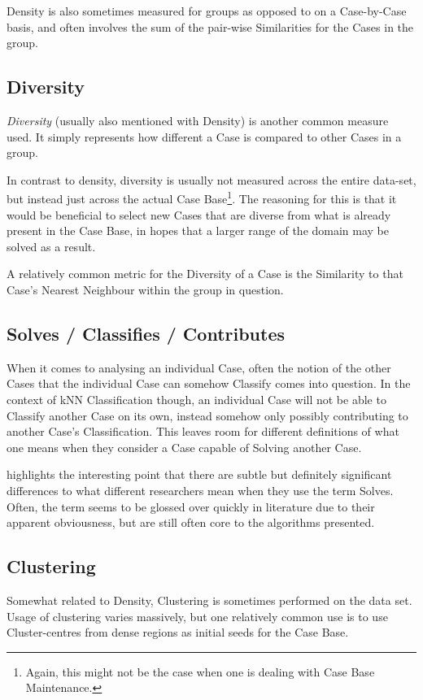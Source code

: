 \documentclass[a4paper,11pt]{report}
\begin{document}
Density is also sometimes measured for groups as opposed to on a Case-by-Case basis\cite{Smyth1998}, and often involves the sum of the pair-wise Similarities for the Cases in the group.

\subsection{Diversity}

\emph{Diversity} (usually also mentioned with Density) is another common measure used. It simply represents how different a Case is compared to other Cases in a group.

In contrast to density, diversity is usually not measured across the entire data-set, but instead just across the actual Case Base\footnote{Again, this might not be the case when one is dealing with Case Base Maintenance.}. The reasoning for this is that it would be beneficial to select new Cases that are diverse from what is already present in the Case Base, in hopes that a larger range of the domain may be solved as a result. 

A relatively common metric for the Diversity of a Case is the Similarity to that Case's Nearest Neighbour within the group in question.

\subsection{Solves / Classifies / Contributes}
When it comes to analysing an individual Case, often the notion of the other Cases that the individual Case can somehow Classify comes into question. In the context of kNN Classification though, an individual Case will not be able to Classify another Case on its own, instead somehow only possibly contributing to another Case's Classification. This leaves room for different definitions of what one means when they consider a Case capable of Solving another Case. 

\citep{BridgeUpcoming} highlights the interesting point that there are subtle but definitely significant differences to what different researchers mean when they use the term Solves. Often, the term seems to be glossed over quickly in literature due to their apparent obviousness, but are still often core to the algorithms presented.

\subsection{Clustering}
Somewhat related to Density, Clustering is sometimes performed on the data set. Usage of clustering varies massively, but one relatively common use is to use Cluster-centres from dense regions as initial seeds for the Case Base.
\end{document}
